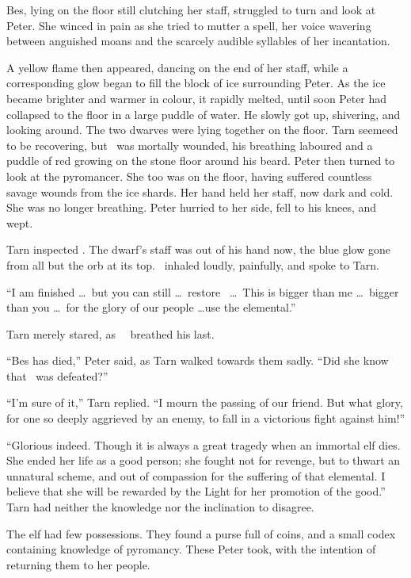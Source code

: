 Bes, lying on the floor still clutching her staff, struggled to turn and look at Peter.  She winced in pain as she tried to mutter a spell, her voice wavering between anguished moans and the scarcely audible syllables of her incantation.

A yellow flame then appeared, dancing on the end of her staff, while a corresponding glow began to fill the block of ice surrounding Peter.  As the ice became brighter and warmer in colour, it rapidly melted, until soon Peter had collapsed to the floor in a large puddle of water.  He slowly got up, shivering, and looking around.  The two dwarves were lying together on the floor.  Tarn seemeed to be recovering, but \mothzam\ was mortally wounded, his breathing laboured and a puddle of red growing on the stone floor around his beard.  Peter then turned to look at the pyromancer.  She too was on the floor, having suffered countless savage wounds from the ice shards.  Her hand held her staff, now dark and cold.  She was no longer breathing.  Peter hurried to her side, fell to his knees, and wept.

Tarn inspected \mothzam.  The dwarf's staff was out of his hand now, the blue glow gone from all but the orb at its top.  \mothzam\ inhaled loudly, painfully, and spoke to Tarn.

``I am finished \ldots\ but you can still \ldots\ restore \valdunmir\ \ldots\ This is bigger than me \ldots\ bigger than you \ldots\ for the glory of our people \ldots use the elemental.''

Tarn merely stared, as \mothzam\ \driktur\ breathed his last.

``Bes has died,'' Peter said, as Tarn walked towards them sadly.  ``Did she know that \mothzam\ was defeated?''

``I'm sure of it,'' Tarn replied.  ``I mourn the passing of our friend.  But what glory, for one so deeply aggrieved by an enemy, to fall in a victorious fight against him!''

``Glorious indeed.  Though it is always a great tragedy when an immortal elf dies.  She ended her life as a good person; she fought not for revenge, but to thwart an unnatural scheme, and out of compassion for the suffering of that elemental.  I believe that she will be rewarded by the Light for her promotion of the good.''  Tarn had neither the knowledge nor the inclination to disagree.

The elf had few possessions.  They found a purse full of coins, and a small codex containing knowledge of pyromancy.  These Peter took, with the intention of returning them to her people.

